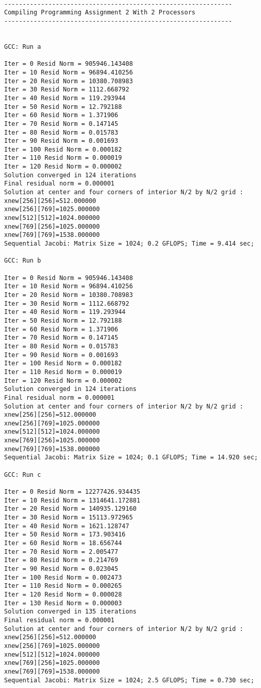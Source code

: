 \documentclass[11pt]{article}
\begin{document}
\begin{lstlisting}
 
--------------------------------------------------------------
Compiling Programming Assignment 2 With 2 Processors
--------------------------------------------------------------
 
 
GCC: Run a
 
Iter = 0 Resid Norm = 905946.143408
Iter = 10 Resid Norm = 96894.410256
Iter = 20 Resid Norm = 10380.708983
Iter = 30 Resid Norm = 1112.668792
Iter = 40 Resid Norm = 119.293944
Iter = 50 Resid Norm = 12.792188
Iter = 60 Resid Norm = 1.371906
Iter = 70 Resid Norm = 0.147145
Iter = 80 Resid Norm = 0.015783
Iter = 90 Resid Norm = 0.001693
Iter = 100 Resid Norm = 0.000182
Iter = 110 Resid Norm = 0.000019
Iter = 120 Resid Norm = 0.000002
Solution converged in 124 iterations
Final residual norm = 0.000001
Solution at center and four corners of interior N/2 by N/2 grid : 
xnew[256][256]=512.000000
xnew[256][769]=1025.000000
xnew[512][512]=1024.000000
xnew[769][256]=1025.000000
xnew[769][769]=1538.000000
Sequential Jacobi: Matrix Size = 1024; 0.2 GFLOPS; Time = 9.414 sec; 
 
GCC: Run b
 
Iter = 0 Resid Norm = 905946.143408
Iter = 10 Resid Norm = 96894.410256
Iter = 20 Resid Norm = 10380.708983
Iter = 30 Resid Norm = 1112.668792
Iter = 40 Resid Norm = 119.293944
Iter = 50 Resid Norm = 12.792188
Iter = 60 Resid Norm = 1.371906
Iter = 70 Resid Norm = 0.147145
Iter = 80 Resid Norm = 0.015783
Iter = 90 Resid Norm = 0.001693
Iter = 100 Resid Norm = 0.000182
Iter = 110 Resid Norm = 0.000019
Iter = 120 Resid Norm = 0.000002
Solution converged in 124 iterations
Final residual norm = 0.000001
Solution at center and four corners of interior N/2 by N/2 grid : 
xnew[256][256]=512.000000
xnew[256][769]=1025.000000
xnew[512][512]=1024.000000
xnew[769][256]=1025.000000
xnew[769][769]=1538.000000
Sequential Jacobi: Matrix Size = 1024; 0.1 GFLOPS; Time = 14.920 sec; 
 
GCC: Run c
 
Iter = 0 Resid Norm = 12277426.934435
Iter = 10 Resid Norm = 1314641.172881
Iter = 20 Resid Norm = 140935.129160
Iter = 30 Resid Norm = 15113.972965
Iter = 40 Resid Norm = 1621.128747
Iter = 50 Resid Norm = 173.903416
Iter = 60 Resid Norm = 18.656744
Iter = 70 Resid Norm = 2.005477
Iter = 80 Resid Norm = 0.214769
Iter = 90 Resid Norm = 0.023045
Iter = 100 Resid Norm = 0.002473
Iter = 110 Resid Norm = 0.000265
Iter = 120 Resid Norm = 0.000028
Iter = 130 Resid Norm = 0.000003
Solution converged in 135 iterations
Final residual norm = 0.000001
Solution at center and four corners of interior N/2 by N/2 grid : 
xnew[256][256]=512.000000
xnew[256][769]=1025.000000
xnew[512][512]=1024.000000
xnew[769][256]=1025.000000
xnew[769][769]=1538.000000
Sequential Jacobi: Matrix Size = 1024; 2.5 GFLOPS; Time = 0.730 sec; 
 

\end{lstlisting}
\end{document}
